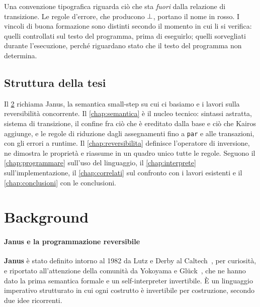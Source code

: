 Una convenzione tipografica riguarda ciò che sta \emph{fuori} dalla relazione di
transizione. Le regole d'errore, che producono $\bot$, portano il nome in
\textcolor{red!60!black}{rosso}. I vincoli di buona formazione sono distinti
secondo il momento in cui li si verifica:  quelli controllati
sul testo del programma, prima di eseguirlo;  quelli
sorvegliati durante l'esecuzione, perché riguardano stato che il testo del
programma non determina.

\section{Struttura della tesi}

Il \cref{chap:background} richiama Janus, la semantica small-step su cui ci
basiamo e i lavori sulla reversibilità concorrente. Il \cref{chap:semantica} è
il nucleo tecnico: sintassi astratta, sistema di transizione, il confine fra ciò
che è ereditato dalla base e ciò che Kairos aggiunge, e le regole di riduzione
dagli assegnamenti fino a \texttt{par} e alle transazioni, con gli errori a
runtime. Il \cref{chap:reversibilita} definisce l'operatore di inversione, ne
dimostra le proprietà e riassume in un quadro unico tutte le regole. Seguono il
\cref{chap:programmare} sull'uso del linguaggio, il \cref{chap:interprete}
sull'implementazione, il \cref{chap:correlati} sul confronto con i lavori
esistenti e il \cref{chap:conclusioni} con le conclusioni.

\chapter{Background}
\label{chap:background}
\label{sec:back}

\subsubsection{Janus e la programmazione reversibile}

\textbf{Janus} è stato definito intorno al 1982 da Lutz e Derby al
Caltech~\cite{LutzDerby1982}, per curiosità, e riportato all'attenzione della comunità da Yokoyama e
Glück~\cite{YokoyamaGluck2007}, che ne hanno dato la prima semantica formale e
un self-interpreter invertibile. È un linguaggio imperativo strutturato in cui
ogni costrutto è invertibile per costruzione, secondo due idee ricorrenti.

